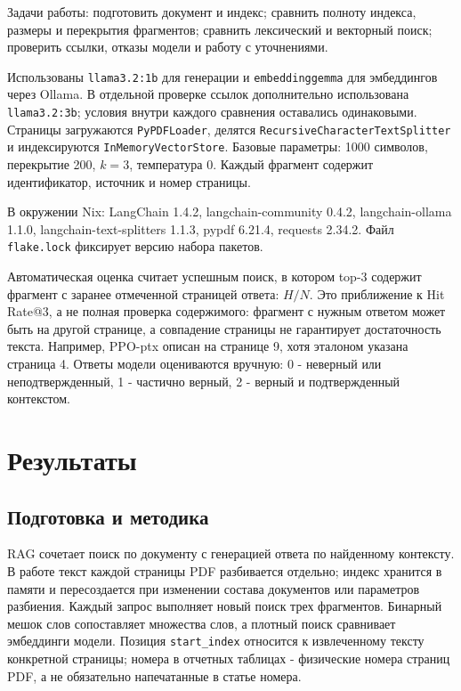\documentclass[12pt,a4paper]{article}
\begin{document}
Задачи работы: подготовить документ и индекс; сравнить полноту индекса, размеры и перекрытия фрагментов; сравнить лексический и векторный поиск; проверить ссылки, отказы модели и работу с уточнениями.

Использованы \texttt{llama3.2:1b} для генерации и \texttt{embeddinggemma} для эмбеддингов через Ollama. В отдельной проверке ссылок дополнительно использована \texttt{llama3.2:3b}; условия внутри каждого сравнения оставались одинаковыми. Страницы загружаются \texttt{PyPDFLoader}, делятся \texttt{Recursive\-Character\-Text\-Splitter} и индексируются \texttt{InMemory\-VectorStore}. Базовые параметры: 1000 символов, перекрытие 200, $k=3$, температура 0. Каждый фрагмент содержит идентификатор, источник и номер страницы.

В окружении Nix: LangChain 1.4.2, langchain-community 0.4.2, langchain-ollama 1.1.0, langchain-text-splitters 1.1.3, pypdf 6.21.4, requests 2.34.2. Файл \texttt{flake.lock} фиксирует версию набора пакетов.

Автоматическая оценка считает успешным поиск, в котором top-3 содержит фрагмент с заранее отмеченной страницей ответа: $H/N$. Это приближение к Hit Rate@3, а не полная проверка содержимого: фрагмент с нужным ответом может быть на другой странице, а совпадение страницы не гарантирует достаточность текста. Например, PPO-ptx описан на странице 9, хотя эталоном указана страница 4. Ответы модели оцениваются вручную: 0 - неверный или неподтвержденный, 1 - частично верный, 2 - верный и подтвержденный контекстом.

\section{Результаты}
\subsection{Подготовка и методика}
RAG сочетает поиск по документу с генерацией ответа по найденному контексту. В работе текст каждой страницы PDF разбивается отдельно; индекс хранится в памяти и пересоздается при изменении состава документов или параметров разбиения. Каждый запрос выполняет новый поиск трех фрагментов. Бинарный мешок слов сопоставляет множества слов, а плотный поиск сравнивает эмбеддинги модели. Позиция \texttt{start\_index} относится к извлеченному тексту конкретной страницы; номера в отчетных таблицах - физические номера страниц PDF, а не обязательно напечатанные в статье номера.
\end{document}

